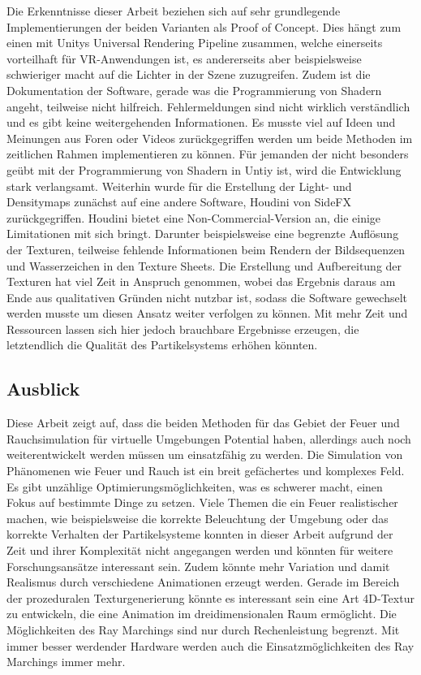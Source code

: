 Die Erkenntnisse dieser Arbeit beziehen sich auf sehr grundlegende Implementierungen der beiden Varianten als Proof of Concept. Dies hängt zum einen mit 
Unitys Universal Rendering Pipeline zusammen, welche einerseits vorteilhaft für VR-Anwendungen ist, es andererseits aber beispielsweise schwieriger macht
auf die Lichter in der Szene zuzugreifen. Zudem ist die Dokumentation der Software, gerade was die Programmierung von Shadern angeht, teilweise nicht hilfreich.
Fehlermeldungen sind nicht wirklich verständlich und es gibt keine weitergehenden Informationen.
Es musste viel auf Ideen und Meinungen aus Foren oder Videos zurückgegriffen werden um beide Methoden im zeitlichen Rahmen implementieren zu können.
Für jemanden der nicht besonders geübt mit der Programmierung von Shadern in Untiy ist, wird die Entwicklung stark verlangsamt. 
Weiterhin wurde für die Erstellung der Light- und Densitymaps zunächst auf eine andere Software, Houdini von SideFX zurückgegriffen.
Houdini bietet eine Non-Commercial-Version an, die einige Limitationen mit sich bringt. Darunter beispielsweise eine begrenzte Auflösung der Texturen, 
teilweise fehlende Informationen beim Rendern der Bildsequenzen und Wasserzeichen in den Texture Sheets. Die Erstellung und Aufbereitung der Texturen hat viel Zeit
in Anspruch genommen, wobei das Ergebnis daraus am Ende aus qualitativen Gründen nicht nutzbar ist, sodass die Software gewechselt werden musste um diesen Ansatz 
weiter verfolgen zu können. Mit mehr Zeit und Ressourcen lassen sich hier jedoch brauchbare Ergebnisse erzeugen, die letztendlich die Qualität des 
Partikelsystems erhöhen könnten. 



\subsection{Ausblick}
\label{sec:6.3}
Diese Arbeit zeigt auf, dass die beiden Methoden für das Gebiet der Feuer und Rauchsimulation für virtuelle Umgebungen Potential haben, allerdings auch noch 
weiterentwickelt werden müssen um einsatzfähig zu werden.   
Die Simulation von Phänomenen wie Feuer und Rauch ist ein breit gefächertes und komplexes Feld. 
Es gibt unzählige Optimierungsmöglichkeiten, was es schwerer macht, einen Fokus auf
bestimmte Dinge zu setzen. Viele Themen die ein Feuer realistischer machen, wie beispielsweise die korrekte Beleuchtung der Umgebung oder das 
korrekte Verhalten der Partikelsysteme konnten in dieser Arbeit aufgrund der Zeit und ihrer Komplexität nicht angegangen werden und könnten für 
weitere Forschungsansätze interessant sein. Zudem könnte mehr Variation und damit Realismus durch verschiedene Animationen erzeugt werden. 
Gerade im Bereich der prozeduralen Texturgenerierung könnte es interessant sein eine Art 4D-Textur zu entwickeln, die eine Animation im dreidimensionalen
Raum ermöglicht. 
Die Möglichkeiten des Ray Marchings sind nur durch Rechenleistung begrenzt. Mit immer besser werdender Hardware werden auch die 
Einsatzmöglichkeiten des Ray Marchings immer mehr.


\newpage

